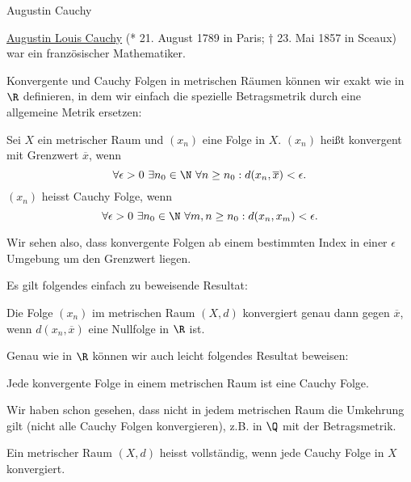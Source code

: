 \documentclass[letterpaper,10pt,english]{jupyterBook}
\begin{document}
\begin{emphBox}{Augustin Cauchy}{}

\href{https://de.wikipedia.org/wiki/Augustin-Louis\_Cauchy}{Augustin Louis Cauchy} (* 21. August 1789 in Paris; † 23. Mai 1857 in Sceaux) war ein französischer Mathematiker.
\end{emphBox}

Konvergente und Cauchy Folgen in metrischen Räumen können wir exakt wie in \(\R\) definieren, in dem wir einfach die spezielle Betragsmetrik durch eine allgemeine Metrik ersetzen:
\label{metrik/konvfolgen:definition-4}
\begin{definition}{}{}



Sei \(X\) ein metrischer Raum und \((x_n)\) eine Folge in \(X\). \((x_n)\) heißt konvergent mit Grenzwert \(\overline{x}\), wenn
\begin{equation*}
 \forall \epsilon  >0 ~\exists n_0 \in \N ~\forall n \geq n_0: d(x_n, \overline{x}) < \epsilon.
\end{equation*}
\((x_n)\) heisst Cauchy Folge, wenn
\begin{equation*}
 \forall \epsilon  >0 ~\exists n_0 \in \N ~\forall m,n \geq n_0: d(x_n, x_m) < \epsilon.
\end{equation*}\end{definition}

Wir sehen also, dass konvergente Folgen ab einem bestimmten Index in einer \(\epsilon\) Umgebung um den Grenzwert liegen.

Es gilt folgendes einfach zu beweisende Resultat:
\label{metrik/konvfolgen:nullfolgenmetrik}
\begin{lemma}{}{}



Die Folge \((x_n)\) im metrischen Raum \((X,d)\) konvergiert genau dann gegen \(\overline{x}\), wenn \(d(x_n,\overline{x})\) eine Nullfolge in \(\R\) ist.
\end{lemma}

Genau wie in \(\R\) können wir auch leicht folgendes Resultat beweisen:
\label{metrik/konvfolgen:theorem-6}
\begin{theorem}{}{}



Jede konvergente Folge in einem metrischen Raum ist eine Cauchy Folge.
\end{theorem}

Wir haben schon gesehen, dass nicht in jedem metrischen Raum die Umkehrung gilt (nicht alle Cauchy Folgen konvergieren), z.B. in \(\Q\) mit der Betragsmetrik.
\label{metrik/konvfolgen:definition-7}
\begin{definition}{}{}



Ein metrischer Raum \((X,d)\) heisst vollständig, wenn jede Cauchy Folge in \(X\) konvergiert.
\end{definition}
\end{document}

